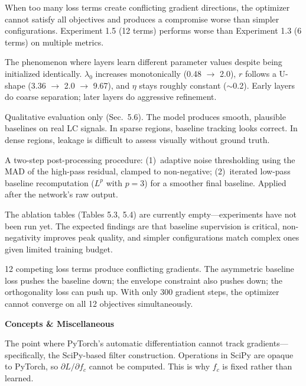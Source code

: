 \documentclass[11pt, letterpaper]{article}
\begin{document}
{When too many loss terms create conflicting gradient directions, the optimizer cannot satisfy all objectives and produces a compromise worse than simpler configurations.  Experiment 1.5 (12 terms) performs worse than Experiment 1.3 (6 terms) on multiple metrics.}

{The phenomenon where layers learn different parameter values despite being initialized identically.  $\lambda_0$ increases monotonically (0.48 $\to$ 2.0), $r$ follows a U-shape (3.36 $\to$ 2.0 $\to$ 9.67), and $\eta$ stays roughly constant ($\sim$0.2).  Early layers do coarse separation; later layers do aggressive refinement.}

{Qualitative evaluation only (Sec.~5.6).  The model produces smooth, plausible baselines on real LC signals.  In sparse regions, baseline tracking looks correct.  In dense regions, leakage is difficult to assess visually without ground truth.}

{A two-step post-processing procedure: (1)~adaptive noise thresholding using the MAD of the high-pass residual, clamped to non-negative; (2)~iterated low-pass baseline recomputation ($L^p$ with $p = 3$) for a smoother final baseline.  Applied after the network's raw output.}

{The ablation tables (Tables 5.3, 5.4) are currently empty---experiments have not been run yet.  The expected findings are that baseline supervision is critical, non-negativity improves peak quality, and simpler configurations match complex ones given limited training budget.}

{12 competing loss terms produce conflicting gradients.  The asymmetric baseline loss pushes the baseline down; the envelope constraint also pushes down; the orthogonality loss can push up.  With only 300 gradient steps, the optimizer cannot converge on all 12 objectives simultaneously.}


\vspace{0.8em}
{\large\bfseries\sffamily\color{SectionBlue} Concepts \& Miscellaneous}\par\vspace{0.2em}

{The point where PyTorch's automatic differentiation cannot track gradients---specifically, the SciPy-based filter construction.  Operations in SciPy are opaque to PyTorch, so $\partial L / \partial f_c$ cannot be computed.  This is why $f_c$ is fixed rather than learned.}
\end{document}
